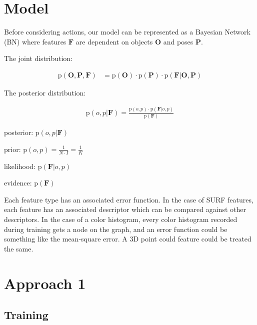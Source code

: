 \documentclass[11pt]{article}
\newcommand{\SetOf}[1]{\mathbf{#1}} %
\newcommand{\prob}[1]{\text{p}(#1)} %
\newcommand{\Eq}[1]{\begin{align*}#1\end{align*}} %
\begin{document}
\section{Model}

	Before considering actions, our model can be represented as a Bayesian Network (BN) where features $\SetOf{F}$ are dependent on objects $\SetOf{O}$ and poses $\SetOf{P}$. 

	\begin{center}
	\end{center}

	The joint distribution:

	\Eq{\prob{\SetOf{O},\SetOf{P},\SetOf{F} } &= \prob{\SetOf{O}} \cdot \prob{\SetOf{P}}  \cdot \prob{\SetOf{F}|\SetOf{O},\SetOf{P} } }

	The posterior distribution:

	\Eq{\prob{o,p|\SetOf{F}} = \frac{\prob{o,p} \cdot \prob{\SetOf{F}|o,p}}{\prob{\SetOf{F}}}}

	posterior: $\prob{o,p|\SetOf{F}}$

	prior: $\prob{o,p} = \frac{1}{N \cdot I} = \frac{1}{K}$

	likelihood: $\prob{\SetOf{F}|o,p}$

	evidence: $\prob{\SetOf{F}}$

	Each feature type has an associated error function. In the case of SURF features, each feature has an associated descriptor which can be compared against other descriptors. In the case of a color histogram, every color histogram recorded during training gets a node on the graph, and an error function could be something like the mean-square error. A 3D point could feature could be treated the same. 

\section{Approach 1}
\subsection{Training}
\end{document}
